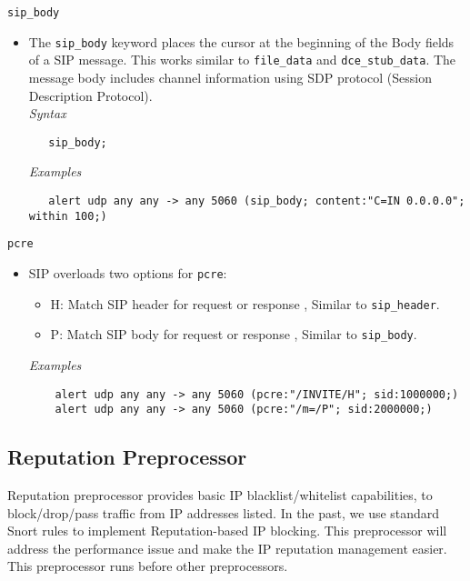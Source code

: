 \documentclass[english]{report}
\begin{document}
\texttt{sip\_body}
\label{sip:sip_body}
\begin{itemize}
 \item[]  The \texttt{sip\_body} keyword places the cursor at the beginning of the Body fields 
  of a SIP message. This works similar to \texttt{file\_data} and \texttt{dce\_stub\_data}. The message
  body includes channel information using SDP protocol (Session Description Protocol).\\

\textit{Syntax}
\footnotesize
\begin{verbatim}
   sip_body;
\end{verbatim}
\normalsize

\textit{Examples}
\footnotesize
\begin{verbatim}
   alert udp any any -> any 5060 (sip_body; content:"C=IN 0.0.0.0"; within 100;)
\end{verbatim}
\normalsize
\end{itemize}
\texttt{pcre}
\label{sip:pcre}
\begin{itemize}
 \item[]  SIP overloads two options for \texttt{pcre}:\\
\begin{itemize}
\item H: Match SIP header for request or response , Similar to \texttt{sip\_header}.\\
\item P: Match SIP body for request or  response , Similar to \texttt{sip\_body}.\\
\end{itemize}
\textit{Examples}
\footnotesize
\begin{verbatim}
    alert udp any any -> any 5060 (pcre:"/INVITE/H"; sid:1000000;)
    alert udp any any -> any 5060 (pcre:"/m=/P"; sid:2000000;)
\end{verbatim}
\normalsize
\end{itemize}

\subsection{Reputation Preprocessor}
\label{sub:reputation}
Reputation preprocessor provides basic IP blacklist/whitelist capabilities, to 
block/drop/pass traffic from IP addresses listed. In the past, we use standard 
Snort rules to implement Reputation-based IP blocking. This preprocessor will 
address the performance issue and make the IP reputation management easier. 
This preprocessor runs before other preprocessors.
\end{document}

